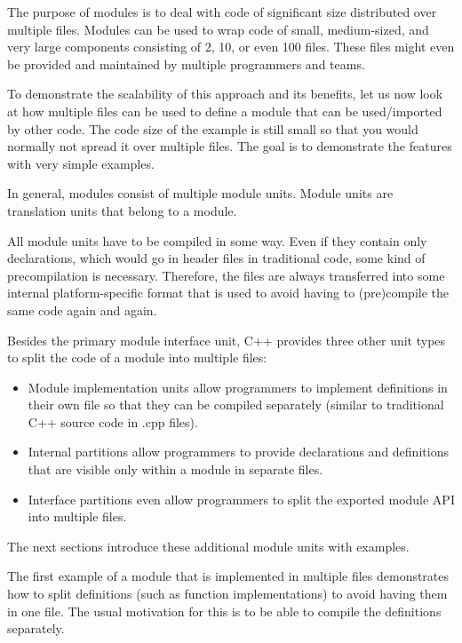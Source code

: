

The purpose of modules is to deal with code of significant size distributed over multiple files. Modules can be used to wrap code of small, medium-sized, and very large components consisting of 2, 10, or even 100 files. These files might even be provided and maintained by multiple programmers and teams.

To demonstrate the scalability of this approach and its benefits, let us now look at how multiple files can be used to define a module that can be used/imported by other code. The code size of the example is still small so that you would normally not spread it over multiple files. The goal is to demonstrate the features with very simple examples.


In general, modules consist of multiple module units. Module units are translation units that belong to a module.

All module units have to be compiled in some way. Even if they contain only declarations, which would go in header files in traditional code, some kind of precompilation is necessary. Therefore, the files are always transferred into some internal platform-specific format that is used to avoid having to (pre)compile the same code again and again.

Besides the primary module interface unit, C++ provides three other unit types to split the code of a module into multiple files:

\begin{itemize}
\item 
Module implementation units allow programmers to implement definitions in their own file so that they can be compiled separately (similar to traditional C++ source code in .cpp files).

\item 
Internal partitions allow programmers to provide declarations and definitions that are visible only within a module in separate files.

\item 
Interface partitions even allow programmers to split the exported module API into multiple files.
\end{itemize}

The next sections introduce these additional module units with examples.


The first example of a module that is implemented in multiple files demonstrates how to split definitions (such as function implementations) to avoid having them in one file. The usual motivation for this is to be able to compile the definitions separately.

